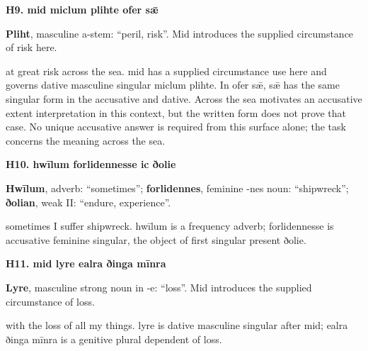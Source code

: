 \par\begin{minipage}{\linewidth}\raggedright
\textbf{H9. mid miclum plihte ofer sǣ}

\textbf{Pliht}, masculine a-stem: “peril, risk”. Mid introduces the supplied circumstance of risk here.

at great risk across the sea. mid has a supplied circumstance use here and governs dative masculine singular miclum plihte. In ofer sǣ, sǣ has the same singular form in the accusative and dative. Across the sea motivates an accusative extent interpretation in this context, but the written form does not prove that case. No unique accusative answer is required from this surface alone; the task concerns the meaning across the sea.

\end{minipage}\par\addvspace{4pt}

\par\begin{minipage}{\linewidth}\raggedright
\textbf{H10. hwīlum forlidennesse ic ðolie}

\textbf{Hwīlum}, adverb: “sometimes”; \textbf{forlidennes}, feminine -nes noun: “shipwreck”; \textbf{ðolian}, weak II: “endure, experience”.

sometimes I suffer shipwreck. hwīlum is a frequency adverb; forlidennesse is accusative feminine singular, the object of first singular present ðolie.

\end{minipage}\par\addvspace{4pt}

\par\begin{minipage}{\linewidth}\raggedright
\textbf{H11. mid lyre ealra ðinga mīnra}

\textbf{Lyre}, masculine strong noun in -e: “loss”. Mid introduces the supplied circumstance of loss.

with the loss of all my things. lyre is dative masculine singular after mid; ealra ðinga mīnra is a genitive plural dependent of loss.

\end{minipage}\par\addvspace{4pt}

